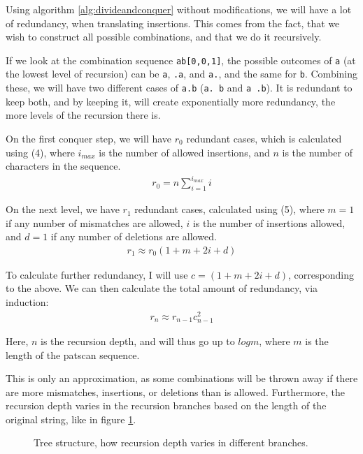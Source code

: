 \documentclass[12pt]{article}
\theoremstyle{definition}
\newcounter{subsubsubsection}[subsubsection]
\begin{document}

Using algorithm \ref{alg:divideandconquer} without modifications, we will have a lot of redundancy, when translating insertions. This comes from the fact, that we wish to construct all possible combinations, and that we do it recursively.

If we look at the combination sequence \texttt{ab[0,0,1]}, the possible outcomes of \texttt{a} (at the lowest level of recursion) can be \texttt{a}, \texttt{.a}, and \texttt{a.}, and the same for \texttt{b}. Combining these, we will have two different cases of \texttt{a.b} (\texttt{a. b} and \texttt{a .b}). It is redundant to keep both, and by keeping it, will create exponentially more redundancy, the more levels of the recursion there is.

On the first conquer step, we will have $r_0$ redundant cases, which is calculated using (4), where $i_{max}$ is the number of allowed insertions, and $n$ is the number of characters in the sequence.
\begin{eqnarray}
	r_0 = n\sum^{i_{max}}_{i=1} i
\end{eqnarray}

On the next level, we have $r_1$ redundant cases, calculated using (5), where $m=1$ if any number of mismatches are allowed, $i$ is the number of insertions allowed, and $d=1$ if any number of deletions are allowed.
\begin{eqnarray}
	r_1 \approx r_0(1 + m + 2i + d)
\end{eqnarray}

To calculate further redundancy, I will use $c = (1 + m + 2i + d)$, corresponding to the above. We can then calculate the total amount of redundancy, via induction:
\begin{eqnarray}
	r_n \approx r_{n-1}c_{n-1}^2
\end{eqnarray}

Here, $n$ is the recursion depth, and will thus go up to $logm$, where $m$ is the length of the patscan sequence.

This is only an approximation, as some combinations will be thrown away if there are more mismatches, insertions, or deletions than is allowed. Furthermore, the recursion depth varies in the recursion branches based on the length of the original string, like in figure \ref{fig:recursion_depth_example}.

\begin{figure}[H]
	\centering
	\caption{Tree structure, how recursion depth varies in different branches.}
	\label{fig:recursion_depth_example}
\end{figure}
\end{document}
